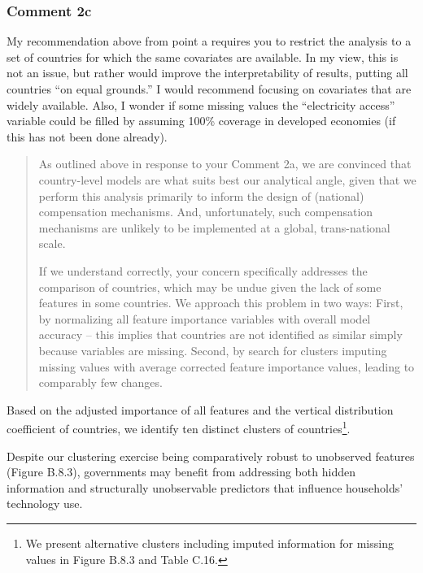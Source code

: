 \documentclass[11pt]{article}
\newenvironment{response}
{\begin{quote}\color{black}}
{\end{quote}}
\begin{document}
\subsubsection*{Comment 2c}\label{comment_R2_2c}

\begin{commentbox}
    My recommendation above from point a requires you to restrict the analysis to a set of countries for which the same covariates are available. In my view, this is not an issue, but rather would improve the interpretability of results, putting all countries “on equal grounds.” I would recommend focusing on covariates that are widely available. Also, I wonder if some missing values the “electricity access” variable could be filled by assuming 100\% coverage in developed economies (if this has not been done already).
\end{commentbox}

\begin{response}
    As outlined above in response to your Comment 2a, we are convinced that country-level models are what suits best our analytical angle, given that we perform this analysis primarily to inform the design of (national) compensation mechanisms. And, unfortunately, such compensation mechanisms are unlikely to be implemented at a global, trans-national scale.

    If we understand correctly, your concern specifically addresses the comparison of countries, which may be undue given the lack of some features in some countries. We approach this problem in two ways: First, by normalizing all feature importance variables with overall model accuracy -- this implies that countries are not identified as similar simply because variables are missing. Second, by search for clusters imputing missing values with average corrected feature importance values, leading to comparably few changes.
\end{response}

\begin{revisionbox}
    Based on the adjusted importance of all features and the vertical distribution coefficient of countries, we identify ten distinct clusters of countries\footnote{We present alternative clusters including imputed information for missing values in Figure B.8.3 and Table C.16.}.
\end{revisionbox}

\begin{revisionbox}
    Despite our clustering exercise being comparatively robust to unobserved features (Figure B.8.3), governments may benefit from addressing both hidden information and structurally unobservable predictors that influence households' technology use. 
\end{revisionbox}
\end{document}
